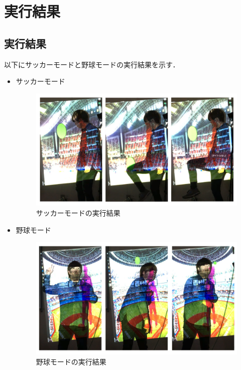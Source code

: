 \chapter{実行結果}
\thispagestyle{fancy}

\section{実行結果}
以下にサッカーモードと野球モードの実行結果を示す．
\begin{itemize}    
    \item サッカーモード
        \begin{figure}[htbp]
            \centering
            \includegraphics[width=12cm]{image/soccer_kekka.png}
            \caption{サッカーモードの実行結果}
            \label{soccer_kekkka}
        \end{figure}

\clearpage

    \item 野球モード
        \begin{figure}[htbp]
            \centering
            \includegraphics[width=12cm]{image/baseball_kekka.png}
            \caption{野球モードの実行結果}
        \label{baseball_kekka}
        \end{figure}
\end{itemize}
